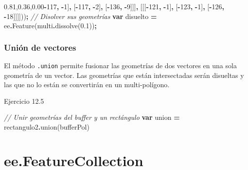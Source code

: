 \documentclass[
  12pt,
  letterpaper,
  twoside]{book}
\newenvironment{Shaded}{\begin{snugshade}}{\end{snugshade}}
\newcommand{\CommentTok}[1]{\textcolor[rgb]{0.56,0.35,0.01}{\textit{#1}}}
\newcommand{\DecValTok}[1]{\textcolor[rgb]{0.00,0.00,0.81}{#1}}
\newcommand{\FloatTok}[1]{\textcolor[rgb]{0.00,0.00,0.81}{#1}}
\newcommand{\FunctionTok}[1]{\textcolor[rgb]{0.00,0.00,0.00}{#1}}
\newcommand{\KeywordTok}[1]{\textcolor[rgb]{0.13,0.29,0.53}{\textbf{#1}}}
\newcommand{\NormalTok}[1]{#1}
\newcommand{\OperatorTok}[1]{\textcolor[rgb]{0.81,0.36,0.00}{\textbf{#1}}}
\begin{document}
\begin{Shaded}
\begin{Highlighting}[]
\NormalTok{             [[[}\OperatorTok{{-}}\DecValTok{117}\OperatorTok{,} \OperatorTok{{-}}\DecValTok{1}\NormalTok{]}\OperatorTok{,}
\NormalTok{               [}\OperatorTok{{-}}\DecValTok{117}\OperatorTok{,} \OperatorTok{{-}}\DecValTok{2}\NormalTok{]}\OperatorTok{,}
\NormalTok{               [}\OperatorTok{{-}}\DecValTok{136}\OperatorTok{,} \OperatorTok{{-}}\DecValTok{9}\NormalTok{]]]}\OperatorTok{,}
\NormalTok{             [[[}\OperatorTok{{-}}\DecValTok{121}\OperatorTok{,} \OperatorTok{{-}}\DecValTok{1}\NormalTok{]}\OperatorTok{,}
\NormalTok{               [}\OperatorTok{{-}}\DecValTok{123}\OperatorTok{,} \OperatorTok{{-}}\DecValTok{1}\NormalTok{]}\OperatorTok{,}
\NormalTok{               [}\OperatorTok{{-}}\DecValTok{126}\OperatorTok{,} \OperatorTok{{-}}\DecValTok{18}\NormalTok{]]]]))}\OperatorTok{;}
\CommentTok{// Disolver sus geometrías}
\KeywordTok{var}\NormalTok{ disuelto }\OperatorTok{=}\NormalTok{ ee}\OperatorTok{.}\FunctionTok{Feature}\NormalTok{(multi}\OperatorTok{.}\FunctionTok{dissolve}\NormalTok{(}\FloatTok{0.1}\NormalTok{))}\OperatorTok{;}
\end{Highlighting}
\end{Shaded}

\hypertarget{uniuxf3n-de-vectores}{%
\subsection*{Unión de vectores}\label{uniuxf3n-de-vectores}}

El método \texttt{.union} permite fusionar las geometrías de dos vectores en una sola geometría de un vector. Las geometrías que están intersectadas serán disueltas y las que no lo están se convertirán en un multi-polígono.

Ejercicio 12.5

\begin{Shaded}
\begin{Highlighting}[]
\CommentTok{// Unir geometrías del buffer y un rectángulo }
\KeywordTok{var}\NormalTok{ union }\OperatorTok{=}\NormalTok{ rectangulo2}\OperatorTok{.}\FunctionTok{union}\NormalTok{(bufferPol)}
\end{Highlighting}
\end{Shaded}

\newpage

\hypertarget{ee.featurecollection-1}{%
\chapter{ee.FeatureCollection}\label{ee.featurecollection-1}}
\end{document}
